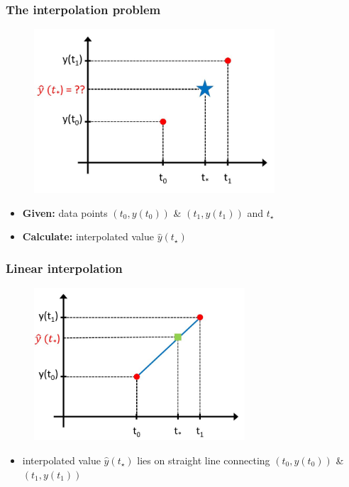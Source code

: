 \documentclass[english,14pt]{beamer}
\begin{document}

\begin{frame}[fragile]

\frametitle{The interpolation problem}

\vspace*{-5mm}
\begin{figure}[ht]
	\centering
	\includegraphics[width=0.8\textwidth]{figures/InterpMeaning}
\end{figure}
\vspace*{-5mm}
\begin{itemize}
	\item[] \textbf{Given:} data points $(t_0,y(t_0))$ \& $(t_1,y(t_1))$ and $t_\star$
	\item[] \textbf{Calculate:} interpolated value $\hat{y}(t_\star)$
\end{itemize}

\end{frame}


\begin{frame}[fragile]

\frametitle{Linear interpolation}

\vspace*{-5mm}
\begin{figure}[ht]
	\centering
	\includegraphics[width=0.7\textwidth]{figures/LinInterpMeaning}
\end{figure}
\vspace*{-5mm}
\begin{itemize}
	\item interpolated value $\hat{y}(t_\star)$ lies on straight line connecting $(t_0,y(t_0))$ \& $(t_1,y(t_1))$
\end{itemize}

\end{frame}
\end{document}
